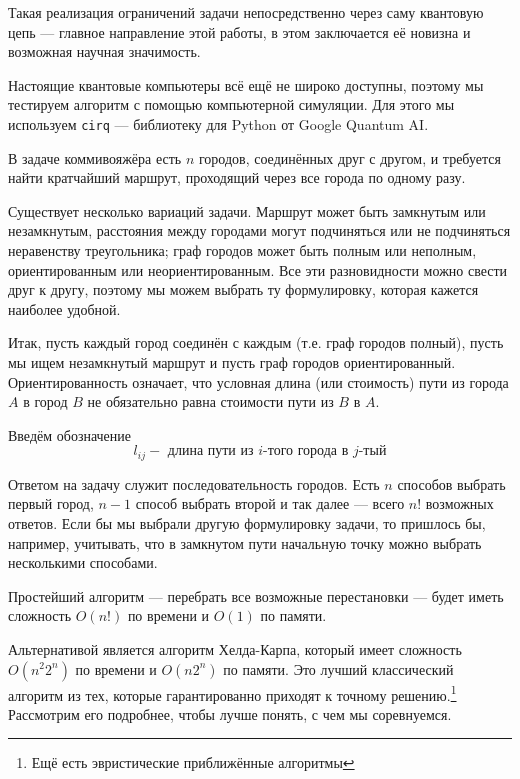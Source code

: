 Такая реализация ограничений задачи непосредственно через саму квантовую цепь --- главное направление этой работы, в этом заключается её новизна и возможная научная значимость.

Настоящие квантовые компьютеры всё ещё не широко доступны, поэтому мы тестируем алгоритм с помощью компьютерной симуляции. Для этого мы используем \texttt{cirq} --- библиотеку для Python от Google Quantum AI.



В задаче коммивояжёра есть $n$ городов, соединённых друг с другом, и требуется найти кратчайший маршрут, проходящий через все города по одному разу.

Существует несколько вариаций задачи. Маршрут может быть замкнутым или незамкнутым, расстояния между городами могут подчиняться или не подчиняться неравенству треугольника; граф городов может быть полным или неполным, ориентированным или неориентированным. Все эти разновидности можно свести друг к другу, поэтому мы можем выбрать ту формулировку, которая кажется наиболее удобной. 

Итак, пусть каждый город соединён с каждым (т.е. граф городов полный), пусть мы ищем незамкнутый маршрут и пусть граф городов ориентированный. Ориентированность означает, что условная длина (или стоимость) пути из города $A$ в город $B$ не обязательно равна стоимости пути из $B$ в $A$.

Введём обозначение
\[
l_{ij} - \text{ длина пути из $i$-того города в $j$-тый}
\]

Ответом на задачу служит последовательность городов. Есть $n$ способов выбрать первый город, $n-1$ способ выбрать второй и так далее --- всего $n!$ возможных ответов. Если бы мы выбрали другую формулировку задачи, то пришлось бы, например, учитывать, что в замкнутом пути начальную точку можно выбрать несколькими способами.

Простейший алгоритм --- перебрать все возможные перестановки --- будет иметь сложность $O(n!)$ по времени и $O(1)$ по памяти.


Альтернативой является алгоритм Хелда-Карпа, который имеет сложность $O(n^2 2^n)$ по времени и $O(n 2^n)$ по памяти. Это лучший классический алгоритм из тех, которые гарантированно приходят к точному решению.\footnote{Ещё есть эвристические приближённые алгоритмы} Рассмотрим его подробнее, чтобы лучше понять, с чем мы соревнуемся.%

